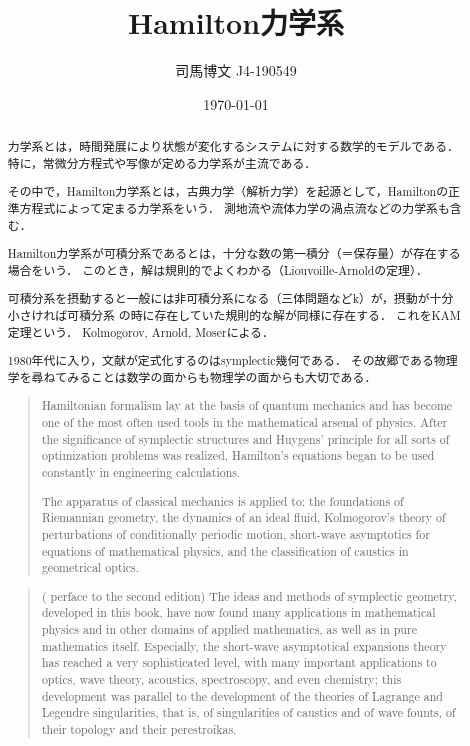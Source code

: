 \documentclass[uplatex, 12pt, dvipdfmx]{jsreport}
\title{Hamilton力学系}
\author{司馬博文 J4-190549}
\date{\today}
\begin{document}
\tableofcontents

\begin{abstract}
    力学系とは，時間発展により状態が変化するシステムに対する数学的モデルである．
    特に，常微分方程式や写像が定める力学系が主流である．

    その中で，Hamilton力学系とは，古典力学（解析力学）を起源として，Hamiltonの正準方程式によって定まる力学系をいう．
    測地流や流体力学の渦点流などの力学系も含む．

    Hamilton力学系が可積分系であるとは，十分な数の第一積分（＝保存量）が存在する場合をいう．
    このとき，解は規則的でよくわかる（Liouvoille-Arnoldの定理）．

    可積分系を摂動すると一般には非可積分系になる（三体問題などk）が，摂動が十分小さければ可積分系
    の時に存在していた規則的な解が同様に存在する．
    これをKAM定理という．
    Kolmogorov, Arnold, Moserによる．

    1980年代に入り，文献\cite{Arnold}が定式化するのはsymplectic幾何である．
    その故郷である物理学を尋ねてみることは数学の面からも物理学の面からも大切である．
    \begin{quotation}
        Hamiltonian formalism lay at the basis of quantum mechanics and has become one of the most often used tools in the mathematical arsenal of physics.
        After the significance of symplectic structures and Huygens' principle for all sorts of optimization problems was realized, Hamilton's equations began to be used constantly in engineering calculations.

        The apparatus of classical mechanics is applied to: the foundations of Riemannian geometry, the dynamics of an ideal fluid, Kolmogorov's theory of perturbations of conditionally periodic motion, short-wave asymptotics for equations of mathematical physics, and the classification of caustics in geometrical optics.
    \end{quotation}
    \begin{quotation}
        (\cite{Arnold} perface to the second edition) The ideas and methods of symplectic geometry, developed in this book, have now found many applications in mathematical physics and in other domains of applied mathematics, as well as in pure mathematics itself. Especially, the short-wave asymptotical expansions theory has reached a very sophisticated level, with many important applications to optics, wave theory, acoustics, spectroscopy, and even chemistry; this development was parallel to the development of the theories of Lagrange and Legendre singularities, that is, of singularities of caustics and of wave founts, of their topology and their perestroikas.
        

\end{quotation}
\end{abstract}
\end{document}
